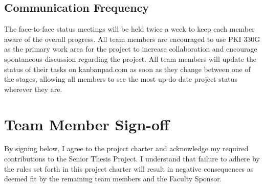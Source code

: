 \subsection{Communication Frequency}
The face-to-face status meetings will be held twice a week to keep each member aware of the overall progress.
All team members are encouraged to use PKI 330G as the primary work area for the project to increase collaboration and encourage spontaneous discussion regarding the project.
All team members will update the status of their tasks on kanbanpad.com as soon as they change between one of the stages, allowing all members to see the most up-do-date project status wherever they are.

\begin{minipage}{\textwidth}
\section{Team Member Sign-off}
By signing below, I agree to the project charter and acknowledge my required contributions to the Senior Thesis Project.
I understand that failure to adhere by the rules set forth in this project charter will result in negative consequences as deemed fit by the remaining team members and the Faculty Sponsor. 

\signatures

\end{minipage}
